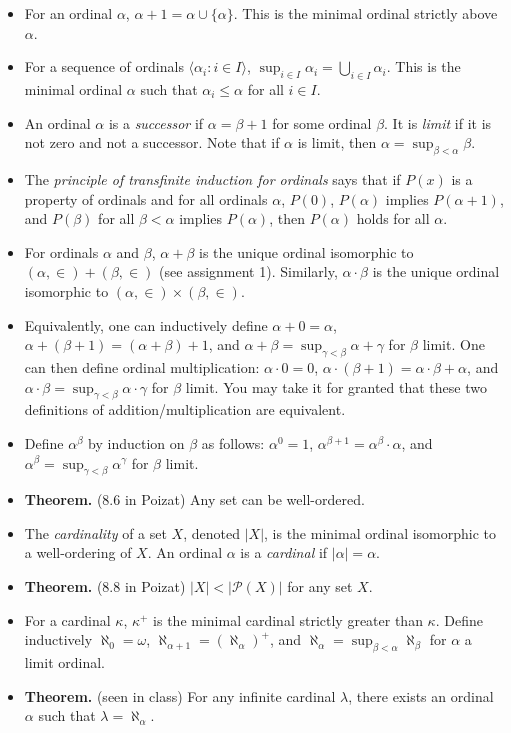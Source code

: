 \documentclass{amsart}
\theoremstyle{definition}
\newcommand{\seq}[1]{\langle #1 \rangle}
\begin{document}
\begin{itemize}
\item For an ordinal $\alpha$, $\alpha + 1 = \alpha \cup \{\alpha\}$. This is the minimal ordinal strictly above $\alpha$.
\item For a sequence of ordinals $\seq{\alpha_i : i \in I}$, $\sup_{i \in I} \alpha_i = \bigcup_{i \in I} \alpha_i$. This is the minimal ordinal $\alpha$ such that $\alpha_i \le \alpha$ for all $i \in I$.
\item An ordinal $\alpha$ is a \emph{successor} if $\alpha = \beta + 1$ for some ordinal $\beta$. It is \emph{limit} if it is not zero and not a successor. Note that if $\alpha$ is limit, then $\alpha = \sup_{\beta < \alpha} \beta$.
\item The \emph{principle of transfinite induction for ordinals} says that if $P (x)$ is a property of ordinals and for all ordinals $\alpha$, $P(0)$, $P (\alpha)$ implies $P (\alpha + 1)$, and $P (\beta)$ for all $\beta < \alpha$ implies $P (\alpha)$, then $P (\alpha)$ holds for all $\alpha$.
\item For ordinals $\alpha$ and $\beta$, $\alpha + \beta$ is the unique ordinal isomorphic to $(\alpha, \in) + (\beta, \in)$ (see assignment 1). Similarly, $\alpha \cdot \beta$ is the unique ordinal isomorphic to $(\alpha, \in) \times (\beta, \in)$.
\item Equivalently, one can inductively define $\alpha + 0 = \alpha$, $\alpha + (\beta + 1) = (\alpha + \beta) + 1$, and $\alpha + \beta = \sup_{\gamma < \beta} \alpha + \gamma$ for $\beta$ limit. One can then define ordinal multiplication: $\alpha \cdot 0 = 0$, $\alpha \cdot (\beta + 1) = \alpha \cdot \beta + \alpha$, and $\alpha \cdot \beta = \sup_{\gamma < \beta} \alpha \cdot \gamma$ for $\beta$ limit. You may take it for granted that these two definitions of addition/multiplication are equivalent.
\item Define $\alpha^\beta$ by induction on $\beta$ as follows: $\alpha^0 = 1$, $\alpha^{\beta + 1} = \alpha^\beta \cdot \alpha$, and $\alpha^\beta = \sup_{\gamma < \beta} \alpha^\gamma$ for $\beta$ limit.
\item \textbf{Theorem.} (8.6 in Poizat) Any set can be well-ordered.
\item The \emph{cardinality} of a set $X$, denoted $|X|$, is the minimal ordinal isomorphic to a well-ordering of $X$. An ordinal $\alpha$ is a \emph{cardinal} if $|\alpha| = \alpha$.
\item \textbf{Theorem.} (8.8 in Poizat) $|X| < |\mathcal{P} (X)|$ for any set $X$.
\item For a cardinal $\kappa$, $\kappa^+$ is the minimal cardinal strictly greater than $\kappa$. Define inductively $\aleph_0 = \omega$, $\aleph_{\alpha + 1} = \left(\aleph_\alpha\right)^+$, and $\aleph_{\alpha} = \sup_{\beta < \alpha} \aleph_\beta$ for $\alpha$ a limit ordinal.
\item \textbf{Theorem.} (seen in class) For any infinite cardinal $\lambda$, there exists an ordinal $\alpha$ such that $\lambda = \aleph_\alpha$.
\end{itemize}
\end{document}
